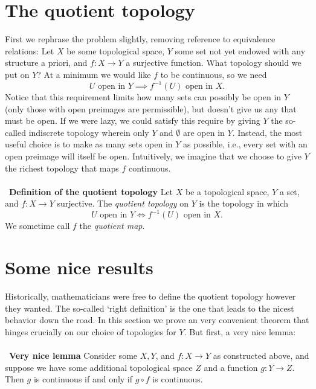 \documentclass[12 pt]{article}
\numberwithin{equation}{section}
\begin{document}
\section{The quotient topology}
First we rephrase the problem slightly, removing reference to equivalence relations: Let $X$ be some topological space, $Y$ some set not yet endowed with any structure a priori, and $f: X \to Y$ a surjective function. What topology should we put on $Y$? At a minimum we would like $f$ to be continuous, so we need \begin{equation*}
U \mbox{ open in } Y \implies f^{-1}(U) \mbox{ open in } X.
\end{equation*}
Notice that this requirement limits how many sets can possibly be open in $Y$ (only those with open preimages are permissible), but doesn't give us any that must be open. If we were lazy, we could satisfy this require by giving $Y$ the so-called indiscrete topology wherein only $Y$ and $\emptyset$ are open in $Y$. Instead, the most useful choice is to make as many sets open in $Y$ as possible, i.e., every set with an open preimage will itself be open. Intuitively, we imagine that we choose to give $Y$ the richest topology that maps $f$ continuous. \\
\\
\
\textbf{Definition of the quotient topology} Let $X$ be a topological space, $Y$ a set, and $f: X \to Y$ surjective. The \textit{quotient topology} on $Y$ is the topology in which \begin{equation*}
U \mbox{ open in } Y \iff f^{-1}(U) \mbox{ open in } X.
\end{equation*}
We sometime call $f$ the \textit{quotient map}.

\section{Some nice results}
Historically, mathematicians were free to define the quotient topology however they wanted. The so-called `right definition' is the one that leads to the nicest behavior down the road. In this section we prove an very convenient theorem that hinges crucially on our choice of topologies for $Y$. But first, a very nice lemma:\\
\\
\
\textbf{Very nice lemma} Consider some $X, Y$, and $f: X \to Y$ as constructed above, and suppose we have some additional topological space $Z$ and a function $g: Y  \to Z$. Then $g$ is continuous if and only if $g \circ f$ is continuous.\\
\\
\
\end{document}
